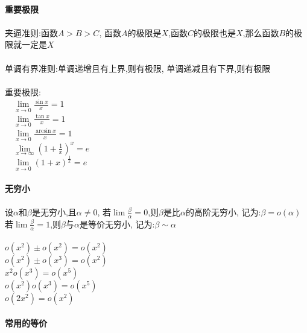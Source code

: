 \documentclass{article}
\begin{document}
\begin{flushleft}
	~\\ \textbf{重要极限}\\~\\
	
	夹逼准则:函数$A>B>C$, 函数$A$的极限是$X$,函数$C$的极限也是$X$,那么函数$B$的极限就一定是$X$\\
	~\\
	单调有界准则:单调递增且有上界,则有极限, 单调递减且有下界,则有极限\\
	~\\
	重要极限:\\
	\ \ $\lim\limits_{x\to 0} \frac{\sin x}{x}=1$\\
	\ \ $\lim\limits_{x\to 0} \frac{\tan x}{x}=1$\\
	\ \ $\lim\limits_{x\to 0} \frac{\arcsin x}{x}=1$\\
	\ \ $\lim\limits_{x\to \infty} (1+\frac{1}{x})^x=e$\\
	\ \ $\lim\limits_{x\to 0} (1+x)^{\frac{1}{x}}=e$\\
	
	~\\ \textbf{无穷小}\\~\\
	
	设$\alpha$和$\beta$是无穷小,且$\alpha \neq 0$,
	若$\lim \frac{\beta}{\alpha}=0$,则$\beta$是比$\alpha$的高阶无穷小,
	记为:$\beta = o(\alpha)$\\
	若$\lim \frac{\beta}{\alpha}=1$,则$\beta$与$\alpha$是等价无穷小,
	记为:$\beta \sim \alpha$\\
	~\\
	$o(x^2)\pm o(x^2)=o(x^2)$\\
	$o(x^2)\pm o(x^3)=o(x^2)$\\
	$x^2 o(x^3)=o(x^5)$\\
	$o(x^2) o(x^3)=o(x^5)$\\
	$o(2x^2)=o(x^2)$\\
	
	~\\ \textbf{常用的等价}\\~\\
	

\end{flushleft}
\end{document}
